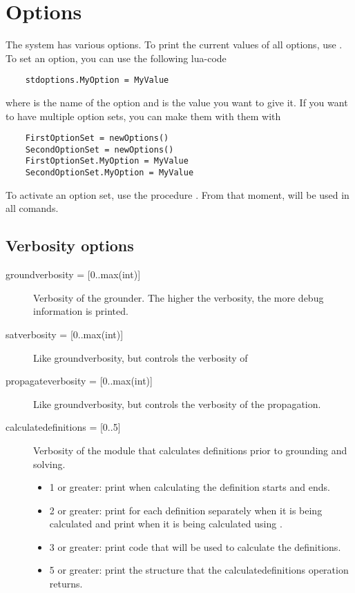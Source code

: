 \section{Options}
The \idp system has various options. To print the current values of all options, use .  To set an option, you can use the following lua-code
\begin{lstlisting}
	stdoptions.MyOption = MyValue
\end{lstlisting}
where  is the name of the option and  is the value you want to give it. If you want to have multiple option sets, you can make them with them with
\begin{lstlisting}
	FirstOptionSet = newOptions()
	SecondOptionSet = newOptions()
	FirstOptionSet.MyOption = MyValue
	SecondOptionSet.MyOption = MyValue
\end{lstlisting}
To activate an option set, use the procedure .  From that moment,  will be used in all comands.

\subsection{Verbosity options}
\begin{description}
	\item[{groundverbosity = [0..max(int)]}] Verbosity of the grounder.  The higher the verbosity, the more debug information is printed.
	\item[{satverbosity = [0..max(int)]}] Like groundverbosity, but controls the verbosity of \minisatid
	\item[{propagateverbosity = [0..max(int)]}] Like groundverbosity, but controls the verbosity of the propagation.
	\item[{calculatedefinitions = [0..5]}] Verbosity of the module that calculates definitions prior to grounding and solving. 
		\begin{itemize}
		\item 1 or greater: print when calculating the definition starts and ends.
		\item 2 or greater: print for each definition separately when it is being calculated and print when it is being calculated using \xsb.
		\item 3 or greater: print \xsb code that will be used to calculate the definitions.
		\item 5 or greater: print the structure that the calculatedefinitions operation returns.
		\end{itemize}
\end{description}


